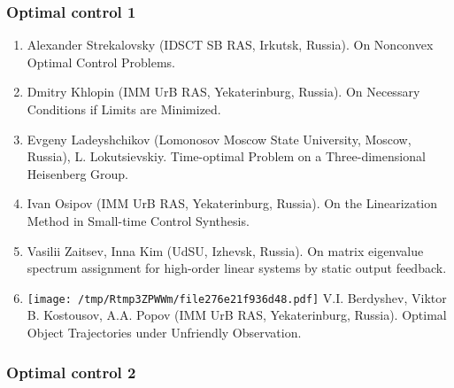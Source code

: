 \documentclass[
]{article}
\providecommand{\tightlist}{%
  \setlength{\itemsep}{0pt}\setlength{\parskip}{0pt}}
\begin{document}
\hypertarget{oc1}{%
\subsubsection{Optimal control 1}\label{oc1}}

\begin{enumerate}
\def\labelenumi{\arabic{enumi}.}
\tightlist
\item
  Alexander Strekalovsky (IDSCT SB RAS, Irkutsk, Russia). On Nonconvex
  Optimal Control Problems.
\item
  Dmitry Khlopin (IMM UrB RAS, Yekaterinburg, Russia). On Necessary
  Conditions if Limits are Minimized.
\item
  Evgeny Ladeyshchikov (Lomonosov Moscow State University, Moscow,
  Russia), L. Lokutsievskiy. Time-optimal Problem on a Three-dimensional
  Heisenberg Group.
\item
  Ivan Osipov (IMM UrB RAS, Yekaterinburg, Russia). On the Linearization
  Method in Small-time Control Synthesis.
\item
  Vasilii Zaitsev, Inna Kim (UdSU, Izhevsk, Russia). On matrix
  eigenvalue spectrum assignment for high-order linear systems by static
  output feedback.
\item
  \protect\texttt{[image: /tmp/Rtmp3ZPWWm/file276e21f936d48.pdf]}
  V.I. Berdyshev, Viktor B. Kostousov, A.A. Popov (IMM UrB RAS,
  Yekaterinburg, Russia). Optimal Object Trajectories under Unfriendly
  Observation.
\end{enumerate}

\hypertarget{oc2}{%
\subsubsection{Optimal control 2}\label{oc2}}
\end{document}
